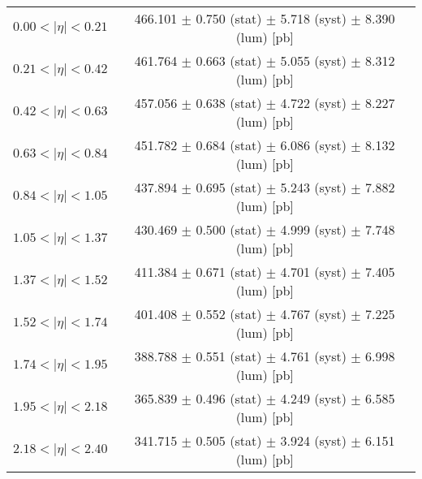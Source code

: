 \begin{tabular}{lc}
\hline
$0.00 < |\eta| <0.21$          & 466.101 $\pm$ 0.750 (stat) $\pm$ 5.718 (syst) $\pm$ 8.390 (lum) [pb]  \\
$0.21 < |\eta| <0.42$          & 461.764 $\pm$ 0.663 (stat) $\pm$ 5.055 (syst) $\pm$ 8.312 (lum) [pb]  \\
$0.42 < |\eta| <0.63$          & 457.056 $\pm$ 0.638 (stat) $\pm$ 4.722 (syst) $\pm$ 8.227 (lum) [pb]  \\
$0.63 < |\eta| <0.84$          & 451.782 $\pm$ 0.684 (stat) $\pm$ 6.086 (syst) $\pm$ 8.132 (lum) [pb]  \\
$0.84 < |\eta| <1.05$          & 437.894 $\pm$ 0.695 (stat) $\pm$ 5.243 (syst) $\pm$ 7.882 (lum) [pb]  \\
$1.05 < |\eta| <1.37$          & 430.469 $\pm$ 0.500 (stat) $\pm$ 4.999 (syst) $\pm$ 7.748 (lum) [pb]  \\
$1.37 < |\eta| <1.52$          & 411.384 $\pm$ 0.671 (stat) $\pm$ 4.701 (syst) $\pm$ 7.405 (lum) [pb]  \\
$1.52 < |\eta| <1.74$          & 401.408 $\pm$ 0.552 (stat) $\pm$ 4.767 (syst) $\pm$ 7.225 (lum) [pb]  \\
$1.74 < |\eta| <1.95$          & 388.788 $\pm$ 0.551 (stat) $\pm$ 4.761 (syst) $\pm$ 6.998 (lum) [pb]  \\
$1.95 < |\eta| <2.18$          & 365.839 $\pm$ 0.496 (stat) $\pm$ 4.249 (syst) $\pm$ 6.585 (lum) [pb]  \\
$2.18 < |\eta| <2.40$          & 341.715 $\pm$ 0.505 (stat) $\pm$ 3.924 (syst) $\pm$ 6.151 (lum) [pb]  \\
\hline
\end{tabular}
